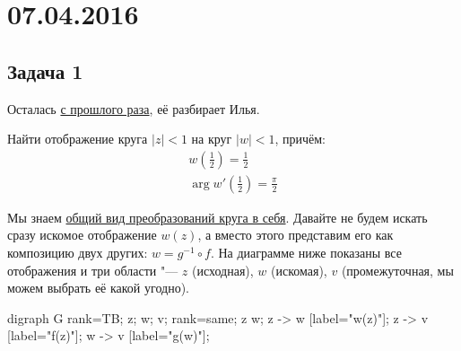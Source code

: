 \chapter{07.04.2016}

\section{Задача 1}\label{day160407_task1}
	Осталась \hyperref[day160331_task1]{с прошлого раза}, её разбирает Илья.

	Найти отображение круга $|z|<1$ на круг $|w|<1$, причём:
	\begin{gather*}
		w\left(\frac 12\right) = \frac12 \\
		\arg w'\left(\frac 12\right) = \frac \pi 2
	\end{gather*}

	Мы знаем \hyperref[day160331_circle_auto]{общий вид преобразований круга в себя}.
	Давайте не будем искать сразу искомое отображение $w(z)$, а вместо этого представим его как композицию двух других: $w = g^{-1} \circ f$.
	На диаграмме ниже показаны все отображения и три области "--- $z$ (исходная), $w$ (искомая), $v$ (промежуточная, мы можем выбрать её какой угодно).
	\begin{center}
		\begin{dot2tex}[options=-tmath]
			digraph G {
				rank=TB;
				z; w; v;
				{rank=same; z w};
				z -> w [label="w(z)"];
				z -> v [label="f(z)"];
				w -> v [label="g(w)"];
			}
		\end{dot2tex}
	\end{center}

